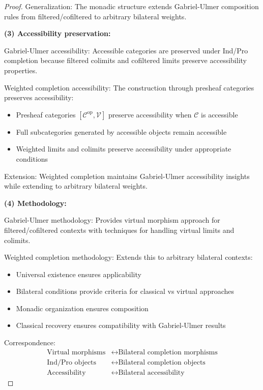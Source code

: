 \documentclass[11pt]{article}
\theoremstyle{plain}
\theoremstyle{definition}
\theoremstyle{remark}
\newcommand{\V}{\mathcal{V}}
\newcommand{\C}{\mathcal{C}}
\newcommand{\op}{\mathrm{op}}
\begin{document}
\begin{proof}
Generalization: The monadic structure extends Gabriel-Ulmer composition rules from filtered/cofiltered to arbitrary bilateral weights.

\textbf{(3) Accessibility preservation:}

Gabriel-Ulmer accessibility: Accessible categories are preserved under Ind/Pro completion because filtered colimits and cofiltered limits preserve accessibility properties.

Weighted completion accessibility: The construction through presheaf categories preserves accessibility:
\begin{itemize}
\item Presheaf categories $[\C^{\op}, \V]$ preserve accessibility when $\C$ is accessible
\item Full subcategories generated by accessible objects remain accessible
\item Weighted limits and colimits preserve accessibility under appropriate conditions
\end{itemize}

Extension: Weighted completion maintains Gabriel-Ulmer accessibility insights while extending to arbitrary bilateral weights.

\textbf{(4) Methodology:}

Gabriel-Ulmer methodology: Provides virtual morphism approach for filtered/cofiltered contexts with techniques for handling virtual limits and colimits.

Weighted completion methodology: Extends this to arbitrary bilateral contexts:
\begin{itemize}
\item Universal existence ensures applicability
\item Bilateral conditions provide criteria for classical vs virtual approaches  
\item Monadic organization ensures composition
\item Classical recovery ensures compatibility with Gabriel-Ulmer results
\end{itemize}

Correspondence:
\begin{align}
\text{Virtual morphisms} &\leftrightarrow \text{Bilateral completion morphisms} \\
\text{Ind/Pro objects} &\leftrightarrow \text{Bilateral completion objects} \\
\text{Accessibility} &\leftrightarrow \text{Bilateral accessibility}
\end{align}
\end{proof}
\end{document}
